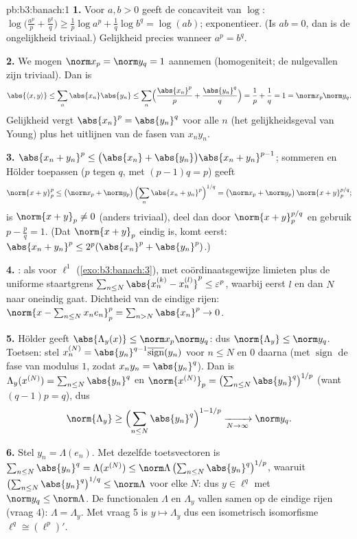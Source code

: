 \begin{solution}{pb:b3:banach:1}
\textbf{1.} Voor $a, b > 0$ geeft de concaviteit van $\log$:
$\log\bigl(\tfrac{a^p}p + \tfrac{b^q}q\bigr) \geq \tfrac1p\log
a^p + \tfrac1q\log b^q = \log(ab)$; exponentieer. (Is $ab = 0$,
dan is de ongelijkheid triviaal.) Gelijkheid precies wanneer $a^p
= b^q$.

\textbf{2.} We mogen $\norm x_p = \norm y_q = 1$ aannemen
(homogeniteit; de nulgevallen zijn triviaal). Dan is
\[
\abs{\langle x, y\rangle} \leq \sum_n\abs{x_n}\abs{y_n}
\leq \sum_n\Bigl(\frac{\abs{x_n}^p}p +
\frac{\abs{y_n}^q}q\Bigr) = \frac1p + \frac1q = 1 =
\norm x_p\norm y_q .
\]
Gelijkheid vergt $\abs{x_n}^p = \abs{y_n}^q$ voor alle $n$ (het
gelijkheidsgeval van Young) plus het uitlijnen van de fasen van
$x_ny_n$.

\textbf{3.} $\abs{x_n + y_n}^p \leq \bigl(\abs{x_n} +
\abs{y_n}\bigr)\abs{x_n + y_n}^{p-1}$; sommeren en Hölder
toepassen ($p$ tegen $q$, met $(p - 1)q = p$) geeft
\[
\norm{x + y}_p^p \leq \bigl(\norm x_p + \norm
y_p\bigr)\,\Bigl(\sum_n\abs{x_n + y_n}^{p}\Bigr)^{1/q}
= \bigl(\norm x_p + \norm y_p\bigr)\,\norm{x+y}_p^{p/q};
\]
is $\norm{x + y}_p \neq 0$ (anders triviaal), deel dan door
$\norm{x+y}_p^{p/q}$ en gebruik $p - \frac pq = 1$. (Dat
$\norm{x+y}_p$ eindig is, komt eerst: $\abs{x_n+y_n}^p \leq
2^p(\abs{x_n}^p + \abs{y_n}^p)$.)

\textbf{4.} : als voor $\ell^1$
(\cref{exo:b3:banach:3}), met coördinaatsgewijze limieten plus de
uniforme staartgrens $\sum_{n\leq N}\abs{x^{(k)}_n -
x^{(l)}_n}^p \leq \varepsilon^p$, waarbij eerst $l$ en dan $N$
naar oneindig gaat. Dichtheid van de eindige rijen: $\norm{x -
\sum_{n\leq N}x_ne_n}_p^p = \sum_{n > N}\abs{x_n}^p \to 0$.

\textbf{5.} Hölder geeft $\abs{\Lambda_y(x)} \leq \norm x_p\norm
y_q$: dus $\norm{\Lambda_y} \leq \norm y_q$. Toetsen: stel
$x^{(N)}_n = \abs{y_n}^{q-1}\overline{\operatorname{sign}}(y_n)$
voor $n \leq N$ en $0$ daarna (met $\operatorname{sign}$ de fase
van modulus $1$, zodat $x_ny_n = \abs{y_n}^q$). Dan is
$\Lambda_y(x^{(N)}) = \sum_{n\leq N}\abs{y_n}^q$ en
$\norm{x^{(N)}}_p = \bigl(\sum_{n\leq N}\abs{y_n}^{q}\bigr)^{1/p}$
(want $(q-1)p = q$), dus
\[
\norm{\Lambda_y} \geq \Bigl(\sum_{n\leq
N}\abs{y_n}^q\Bigr)^{1 - 1/p} \xrightarrow[N\to\infty]{}
\norm y_q .
\]

\textbf{6.} Stel $y_n = \Lambda(e_n)$. Met dezelfde toetsvectoren
is $\sum_{n \leq N}\abs{y_n}^q = \Lambda(x^{(N)}) \leq
\norm\Lambda\,\bigl(\sum_{n\leq N}\abs{y_n}^q\bigr)^{1/p}$,
waaruit $\bigl(\sum_{n\leq N}\abs{y_n}^q\bigr)^{1/q} \leq
\norm\Lambda$ voor elke $N$: dus $y \in \ell^q$ met $\norm y_q
\leq \norm\Lambda$. De functionalen $\Lambda$ en $\Lambda_y$
vallen samen op de  eindige rijen (vraag 4): $\Lambda =
\Lambda_y$. Met vraag 5 is $y \mapsto \Lambda_y$ dus een
isometrisch isomorfisme $\ell^q \cong (\ell^p)'$.


\end{solution}
